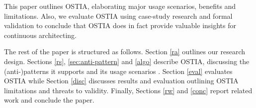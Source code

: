 This paper outlines OSTIA, elaborating major usage scenarios, benefits and limitations. Also, we evaluate OSTIA using case-study research and formal validation to conclude that OSTIA does in fact provide valuable insights for continuous architecting.

The rest of the paper is structured as follows. Section \ref{ra} outlines our research design. Sections \ref{rs}, \ref{sec:anti-pattern} and \ref{algo} describe OSTIA, discussing the (anti-)patterns it supports and its usage scenarios . Section \ref{eval} evaluates OSTIA while Section \ref{disc} discusses results and evaluation outlining OSTIA limitations and threats to validity. Finally, Sections \ref{rw} and \ref{conc} report related work and conclude the paper.
